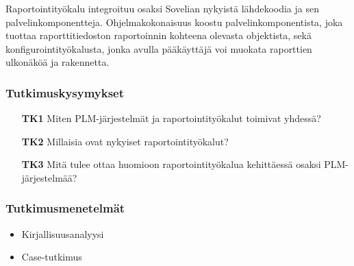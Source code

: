 Raportointityökalu integroituu osaksi Sovelian nykyistä lähdekoodia ja sen palvelinkomponentteja. Ohjelmakokonaisuus koostu palvelinkomponentista, joka tuottaa raporttitiedoston raportoinnin kohteena olevasta objektista, sekä konfigurointityökalusta, jonka avulla pääkäyttäjä voi muokata raporttien ulkonäköä ja rakennetta.

\subsubsection{Tutkimuskysymykset}
\begin{itemize}
\item[\textbf{TK1}] Miten PLM-järjestelmät ja raportointityökalut toimivat yhdessä?
\item[\textbf{TK2}] Millaisia ovat nykyiset raportointityökalut?
\item[\textbf{TK3}] Mitä tulee ottaa huomioon raportointityökalua kehittäessä osaksi PLM-järjestelmää?
\end{itemize}

\subsubsection{Tutkimusmenetelmät}
\begin{itemize}
\item Kirjallisuusanalyysi
\item Case-tutkimus
\end{itemize}

